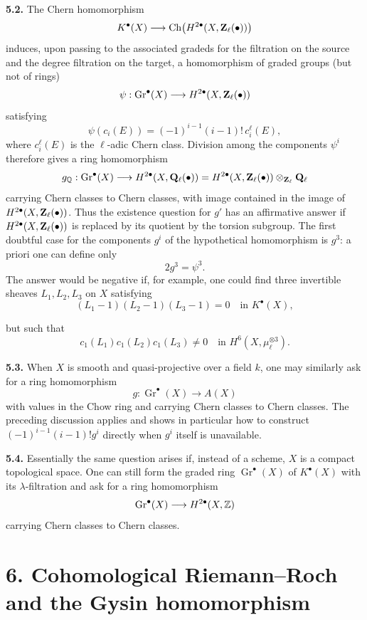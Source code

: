 \textbf{5.2.} The Chern homomorphism
\[
 K^\bullet(X)\longrightarrow
 \operatorname{Ch}\bigl(H^{2\bullet}(X,\mathbf Z_\ell(\bullet))\bigr)
\]
induces, upon passing to the associated gradeds for the filtration on the
source and the degree filtration on the target, a homomorphism of graded
groups (but not of rings)
\[
 \psi:\operatorname{Gr}^\bullet(X)
   \longrightarrow H^{2\bullet}(X,\mathbf Z_\ell(\bullet))
\]
satisfying
\[
 \psi(c_i(E))=(-1)^{i-1}(i-1)!\,c_i^\ell(E),
\]
where $c_i^\ell(E)$ is the $\ell$-adic Chern class. Division among the
components $\psi^i$ therefore gives a ring homomorphism
\[
 g_\mathbb Q:\operatorname{Gr}^\bullet(X)
   \longrightarrow H^{2\bullet}(X,\mathbf Q_\ell(\bullet))
   =H^{2\bullet}(X,\mathbf Z_\ell(\bullet))\otimes_{\mathbf Z_\ell}\mathbf Q_\ell
\]
carrying Chern classes to Chern classes, with image contained in the image
of $H^{2\bullet}(X,\mathbf Z_\ell(\bullet))$. Thus the existence question for $g'$
has an affirmative answer if $H^{2\bullet}(X,\mathbf Z_\ell(\bullet))$ is replaced
by its quotient by the torsion subgroup. The first doubtful case for the
components $g^i$ of the hypothetical homomorphism is $g^3$: a priori one
can define only
\[
 2g^3=\psi^3.
\]
The answer would be negative if, for example, one could find three
invertible sheaves $L_1,L_2,L_3$ on $X$ satisfying
\[
 (L_1-1)(L_2-1)(L_3-1)=0\quad\text{in }K^\bullet(X),
\]

but such that
\[
 c_1(L_1)c_1(L_2)c_1(L_3)\ne0
   \quad\text{in }H^6(X,\mu_\ell^{\otimes3}).
\]

\textbf{5.3.} When $X$ is smooth and quasi-projective over a field $k$,
one may similarly ask for a ring homomorphism
\[
 g:\operatorname{Gr}^\bullet(X)\longrightarrow A(X)
\]
with values in the Chow ring and carrying Chern classes to Chern classes.
The preceding discussion applies and shows in particular how to construct
$(-1)^{i-1}(i-1)!g^i$ directly when $g^i$ itself is unavailable.

\textbf{5.4.} Essentially the same question arises if, instead of a scheme,
$X$ is a compact topological space. One can still form the graded ring
$\operatorname{Gr}^\bullet(X)$ of $K^\bullet(X)$ with its
$\lambda$-filtration and ask for a ring homomorphism
\[
 \operatorname{Gr}^\bullet(X)\longrightarrow H^{2\bullet}(X,\mathbb Z)
\]
carrying Chern classes to Chern classes.

\section*{6. Cohomological Riemann--Roch and the Gysin homomorphism}

